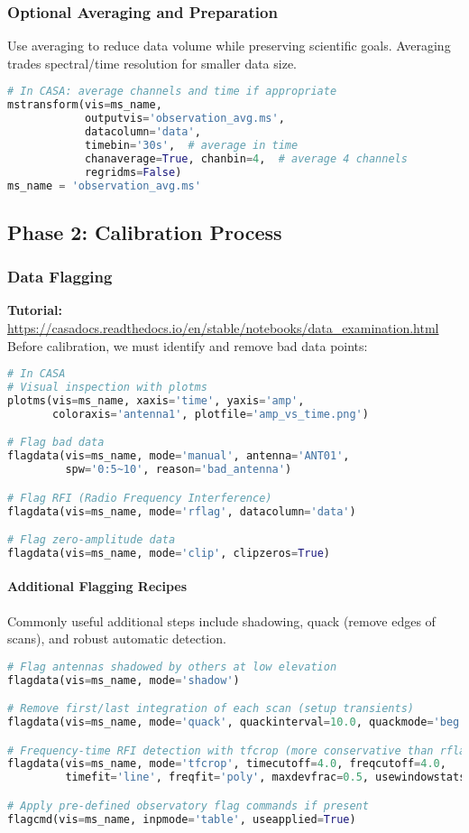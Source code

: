 \documentclass[11pt]{article}
\begin{document}
\subsubsection{Optional Averaging and Preparation}
Use averaging to reduce data volume while preserving scientific goals. Averaging trades spectral/time resolution for smaller data size.
\begin{lstlisting}[language=Python]
# In CASA: average channels and time if appropriate
mstransform(vis=ms_name,
            outputvis='observation_avg.ms',
            datacolumn='data',
            timebin='30s',  # average in time
            chanaverage=True, chanbin=4,  # average 4 channels
            regridms=False)
ms_name = 'observation_avg.ms'
\end{lstlisting}

\subsection{Phase 2: Calibration Process}

\subsubsection{Data Flagging}
\textbf{Tutorial:} \url{https://casadocs.readthedocs.io/en/stable/notebooks/data_examination.html}
Before calibration, we must identify and remove bad data points:

\begin{lstlisting}[language=Python]
# In CASA
# Visual inspection with plotms
plotms(vis=ms_name, xaxis='time', yaxis='amp', 
       coloraxis='antenna1', plotfile='amp_vs_time.png')

# Flag bad data
flagdata(vis=ms_name, mode='manual', antenna='ANT01', 
         spw='0:5~10', reason='bad_antenna')

# Flag RFI (Radio Frequency Interference)
flagdata(vis=ms_name, mode='rflag', datacolumn='data')

# Flag zero-amplitude data
flagdata(vis=ms_name, mode='clip', clipzeros=True)
\end{lstlisting}

\paragraph{Additional Flagging Recipes}
Commonly useful additional steps include shadowing, quack (remove edges of scans), and robust automatic detection.
\begin{lstlisting}[language=Python]
# Flag antennas shadowed by others at low elevation
flagdata(vis=ms_name, mode='shadow')

# Remove first/last integration of each scan (setup transients)
flagdata(vis=ms_name, mode='quack', quackinterval=10.0, quackmode='beg')

# Frequency-time RFI detection with tfcrop (more conservative than rflag)
flagdata(vis=ms_name, mode='tfcrop', timecutoff=4.0, freqcutoff=4.0,
         timefit='line', freqfit='poly', maxdevfrac=0.5, usewindowstats='sum')

# Apply pre-defined observatory flag commands if present
flagcmd(vis=ms_name, inpmode='table', useapplied=True)
\end{lstlisting}
\end{document}
